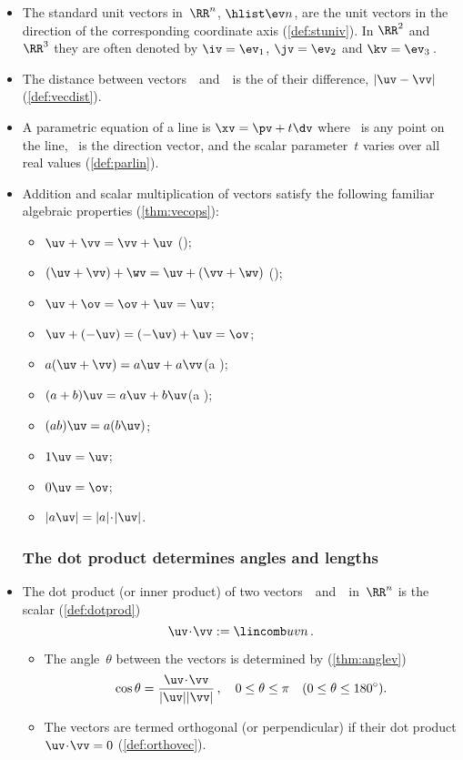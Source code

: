 \begin{itemize}
\item The {standard unit vector}s in~\(\RR^n\), \(\hlist\ev n\), are the unit vectors in the direction of the corresponding coordinate axis (\autoref{def:stuniv}).
In \(\RR^2\) and~\(\RR^3\) they are often denoted by \(\iv=\ev_1\), \(\jv=\ev_2\) and \(\kv=\ev_3\)\,.

\item The {distance} between vectors~\uv\ and~\vv\ is the  of their difference, \(|\uv-\vv|\) (\autoref{def:vecdist}).

\item A {parametric equation} of a line is \(\xv=\pv+t\dv\) where \pv~is any point on the line, \dv~is the {direction vector}, and the {scalar} {parameter}~\(t\) varies over all real values (\autoref{def:parlin}).

\item Addition and scalar multiplication of vectors satisfy the following familiar algebraic properties (\autoref{thm:vecops}):
\begin{itemize}
\item \(\uv+\vv=\vv+\uv\) \quad();
\item \((\uv+\vv)+\wv=\uv+(\vv+\wv)\) \quad();
\item \(\uv+\ov=\ov+\uv=\uv\);
\item \(\uv+(-\uv)=(-\uv)+\uv=\ov\);
\item \(a(\uv+\vv)=a\uv+a\vv\)\quad(a );
\item \((a+b)\uv=a\uv+b\uv\)\quad(a );
\item \((ab)\uv=a(b\uv)\);
\item \(1\uv=\uv\);
\item \(0\uv=\ov\);
\item \(|a\uv|=|a|\cdot|\uv|\).
\end{itemize}




\subsubsection{The dot product determines angles and lengths}

\item The {dot product} (or {inner product}) of two vectors~\uv\ and~\vv\ in~\(\RR^n\) is the {scalar} (\autoref{def:dotprod})
\begin{equation*}
\uv\cdot \vv:= \lincomb uvn\,.
\end{equation*}
\begin{itemize}
\item  The {angle}~\(\theta\) between the vectors is determined by (\autoref{thm:anglev})
\begin{equation*}
\cos\theta=\frac{\uv\cdot\vv}{|\uv||\vv|}\,,
\quad 0\leq\theta\leq\pi
\quad (0\leq\theta\leq180^\circ).
\end{equation*}
\item The vectors are termed {orthogonal} (or {perpendicular}) if their dot product \(\uv\cdot\vv=0\) (\autoref{def:orthovec}).
\end{itemize}


\end{itemize}
